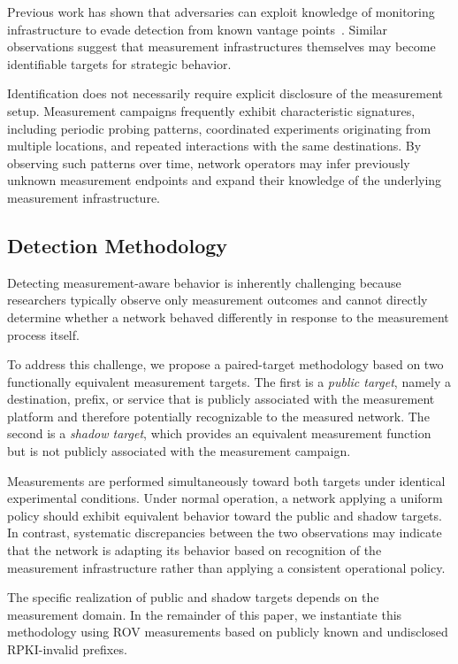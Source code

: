 \documentclass[sigconf, 10pt, anonymous, nonacm]{acmart}
\begin{document}
Previous work has shown that adversaries can exploit knowledge of monitoring infrastructure to evade detection from known vantage points~\cite{global_bgp_attacks,sico}. Similar observations suggest that measurement infrastructures themselves may become identifiable targets for strategic behavior.

Identification does not necessarily require explicit disclosure of the measurement setup. Measurement campaigns frequently exhibit characteristic signatures, including periodic probing patterns, coordinated experiments originating from multiple locations, and repeated interactions with the same destinations. By observing such patterns over time, network operators may infer previously unknown measurement endpoints and expand their knowledge of the underlying measurement infrastructure.

\subsection{Detection Methodology}

Detecting measurement-aware behavior is inherently challenging because researchers typically observe only measurement outcomes and cannot directly determine whether a network behaved differently in response to the measurement process itself.

To address this challenge, we propose a paired-target methodology based on two functionally equivalent measurement targets. The first is a \emph{public target}, namely a destination, prefix, or service that is publicly associated with the measurement platform and therefore potentially recognizable to the measured network. The second is a \emph{shadow target}, which provides an equivalent measurement function but is not publicly associated with the measurement campaign.

Measurements are performed simultaneously toward both targets under identical experimental conditions. Under normal operation, a network applying a uniform policy should exhibit equivalent behavior toward the public and shadow targets. In contrast, systematic discrepancies between the two observations may indicate that the network is adapting its behavior based on recognition of the measurement infrastructure rather than applying a consistent operational policy.

The specific realization of public and shadow targets depends on the measurement domain. In the remainder of this paper, we instantiate this methodology using ROV measurements based on publicly known and undisclosed RPKI-invalid prefixes.
\end{document}
